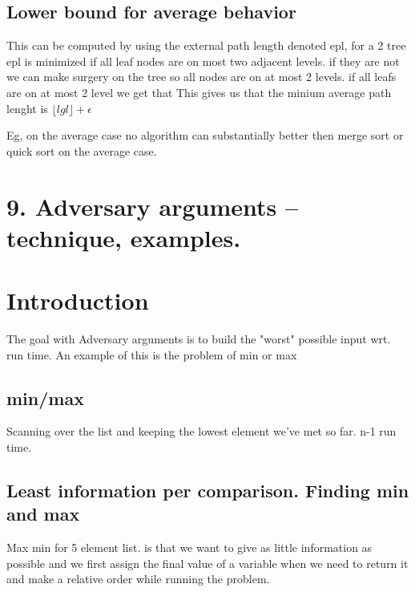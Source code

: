 \documentclass[a4paper,10pt,titlepage]{report}
\begin{document}
\subsection{Lower bound for average behavior}

This can be computed by using the external path length denoted epl, for a 2 tree epl is minimized if all leaf nodes are on most two adjacent levels. if they are not we can make surgery on the tree so all nodes are on at most 2 levels. if all leafs are on at most 2 level we get that This gives us that the minium average path lenght is $\lfloor lg l \rfloor + \epsilon$

Eg, on the average case no algorithm can substantially better then merge sort or quick sort on the average case.\\





\newpage
\section{9. Adversary arguments – technique, examples.}

\section{Introduction}
The goal with Adversary arguments is to build the "worst" possible input wrt. run time. An example of this is the problem of min or max\\

\subsection{min/max}

Scanning over the list and keeping the lowest element we've met so far. n-1 run time.\\

\subsection{Least information per comparison. Finding min and max}

Max min for 5 element list. is that we want to give as little information as possible and we first assign the final value of a variable when we need to return it and make a relative order while running the problem.\\
\end{document}
